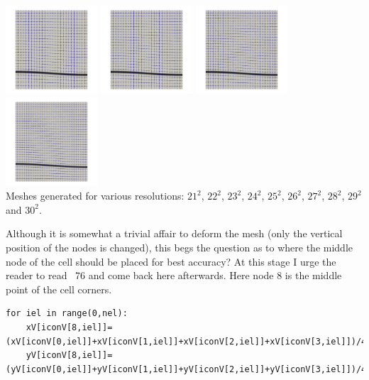 \begin{center}
\includegraphics[width=3.42cm]{python_codes/fieldstone_25/images/mesh.0006.jpg}
\includegraphics[width=3.42cm]{python_codes/fieldstone_25/images/mesh.0007.jpg}
\includegraphics[width=3.42cm]{python_codes/fieldstone_25/images/mesh.0008.jpg}
\includegraphics[width=3.42cm]{python_codes/fieldstone_25/images/mesh.0009.jpg}\\
{\captionfont Meshes generated for various resolutions: $21^2$, $22^2$, $23^2$, 
$24^2$, $25^2$, $26^2$, $27^2$, $28^2$, $29^2$ and $30^2$.}
\end{center}

Although it is somewhat a trivial affair to deform the mesh (only the vertical 
position of the nodes is changed), this begs the question as to where the middle node
of the cell should be placed for best accuracy?
At this stage I urge the reader to read \stone~76 and come back here afterwards. 
Here node 8 is the middle point of the cell corners.
\begin{lstlisting}
for iel in range(0,nel):
    xV[iconV[8,iel]]=(xV[iconV[0,iel]]+xV[iconV[1,iel]]+xV[iconV[2,iel]]+xV[iconV[3,iel]])/4
    yV[iconV[8,iel]]=(yV[iconV[0,iel]]+yV[iconV[1,iel]]+yV[iconV[2,iel]]+yV[iconV[3,iel]])/4
\end{lstlisting}

